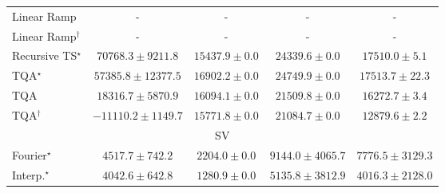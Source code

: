 \begin{tabular}{l|cccc|}
Linear Ramp & {\cellcolor[HTML]{000000}} \color[HTML]{F1F1F1} {\cellcolor{white}} \color{black} - & {\cellcolor[HTML]{000000}} \color[HTML]{F1F1F1} {\cellcolor{white}} \color{black} - & {\cellcolor[HTML]{000000}} \color[HTML]{F1F1F1} {\cellcolor{white}} \color{black} - & {\cellcolor[HTML]{000000}} \color[HTML]{F1F1F1} {\cellcolor{white}} \color{black} - \\
Linear Ramp$^\dagger$ & {\cellcolor[HTML]{000000}} \color[HTML]{F1F1F1} {\cellcolor{white}} \color{black} - & {\cellcolor[HTML]{000000}} \color[HTML]{F1F1F1} {\cellcolor{white}} \color{black} - & {\cellcolor[HTML]{000000}} \color[HTML]{F1F1F1} {\cellcolor{white}} \color{black} - & {\cellcolor[HTML]{000000}} \color[HTML]{F1F1F1} {\cellcolor{white}} \color{black} - \\
Recursive TS$^\star$ & {\cellcolor[HTML]{004C2C}} \color[HTML]{F1F1F1} $70768.3\pm 9211.8$ & {\cellcolor[HTML]{C3E698}} \color[HTML]{000000} $15437.9\pm 0.0$ & {\cellcolor[HTML]{9AD587}} \color[HTML]{000000} $24339.6\pm 0.0$ & {\cellcolor[HTML]{B9E294}} \color[HTML]{000000} $17510.0\pm 5.1$ \\
TQA$^\star$ & {\cellcolor[HTML]{11753D}} \color[HTML]{F1F1F1} $57385.8\pm 12377.5$ & {\cellcolor[HTML]{BCE395}} \color[HTML]{000000} $16902.2\pm 0.0$ & {\cellcolor[HTML]{97D385}} \color[HTML]{000000} $24749.9\pm 0.0$ & {\cellcolor[HTML]{B9E294}} \color[HTML]{000000} $17513.7\pm 22.3$ \\
TQA & {\cellcolor[HTML]{B6E192}} \color[HTML]{000000} $18316.7\pm 5870.9$ & {\cellcolor[HTML]{C0E597}} \color[HTML]{000000} $16094.1\pm 0.0$ & {\cellcolor[HTML]{A7DB8C}} \color[HTML]{000000} $21509.8\pm 0.0$ & {\cellcolor[HTML]{BEE596}} \color[HTML]{000000} $16272.7\pm 3.4$ \\
TQA$^\dagger$ & {\cellcolor[HTML]{FFFFE5}} \color[HTML]{000000} $-11110.2\pm 1149.7$ & {\cellcolor[HTML]{C1E698}} \color[HTML]{000000} $15771.8\pm 0.0$ & {\cellcolor[HTML]{ABDC8D}} \color[HTML]{000000} $21084.7\pm 0.0$ & {\cellcolor[HTML]{CCEA9D}} \color[HTML]{000000} $12879.6\pm 2.2$ \\
\cline{1-5}
\multicolumn{5}{c}{\rule{0pt}{8pt}SV} \\
\midrule
Fourier$^\star$ & {\cellcolor[HTML]{97B7D7}} \color[HTML]{000000} $4517.7\pm 742.2$ & {\cellcolor[HTML]{EDE8F3}} \color[HTML]{000000} $2204.0\pm 0.0$ & {\cellcolor[HTML]{023858}} \color[HTML]{F1F1F1} $9144.0\pm 4065.7$ & {\cellcolor[HTML]{04629A}} \color[HTML]{F1F1F1} $7776.5\pm 3129.3$ \\
Interp.$^\star$ & {\cellcolor[HTML]{AFC1DD}} \color[HTML]{000000} $4042.6\pm 642.8$ & {\cellcolor[HTML]{FFF7FB}} \color[HTML]{000000} $1280.9\pm 0.0$ & {\cellcolor[HTML]{78ABD0}} \color[HTML]{F1F1F1} $5135.8\pm 3812.9$ & {\cellcolor[HTML]{AFC1DD}} \color[HTML]{000000} $4016.3\pm 2128.0$ \\

\end{tabular}
